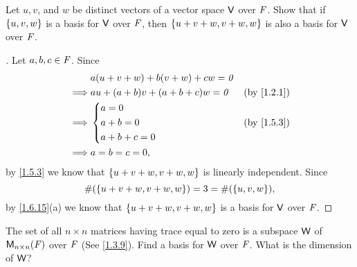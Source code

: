 \begin{ex}\label{ex:1.6.12}
	Let \(u, v\), and \(w\) be distinct vectors of a vector space \(\mathsf{V}\) over \(\mathit{F}\).
	Show that if \(\left\lbrace u, v, w\right\rbrace\) is a basis for \(\mathsf{V}\) over \(\mathit{F}\), then \(\left\lbrace u + v + w, v + w, w\right\rbrace\) is also a basis for \(\mathsf{V}\) over \(\mathit{F}\).
\end{ex}

\begin{proof}[]
	Let \(a, b, c \in \mathit{F}\).
	Since
	\begin{align*}
		         & a(u + v + w) + b(v + w) + cw = \zv                 \\
		\implies & au + (a + b)v + (a + b + c)w = \zv &  & \by{1.2.1} \\
		\implies & \begin{dcases}
			           a = 0     \\
			           a + b = 0 \\
			           a + b + c = 0
		           \end{dcases}                     &  & \by{1.5.3}   \\
		\implies & a = b = c = 0,
	\end{align*}
	by \cref{1.5.3} we know that \(\left\lbrace u + v + w, v + w, w\right\rbrace\) is linearly independent.
	Since
	\[
		\#(\left\lbrace u + v + w, v + w, w\right\rbrace) = 3 = \#(\left\lbrace u, v, w\right\rbrace),
	\]
	by \cref{1.6.15}(a) we know that \(\left\lbrace u + v + w, v + w, w\right\rbrace\) is a basis for \(\mathsf{V}\) over \(\mathit{F}\).
\end{proof}

\setcounter{ex}{14}
\begin{ex}\label{ex:1.6.15}
	The set of all \(n \times n\) matrices having trace equal to zero is a subspace \(\mathsf{W}\) of \(\mathsf{M}_{{n} \times n}({\mathit{F}})\) over \(\mathit{F}\) (See \cref{1.3.9}).
	Find a basis for \(\mathsf{W}\) over \(\mathit{F}\).
	What is the dimension of \(\mathsf{W}\)?
\end{ex}

